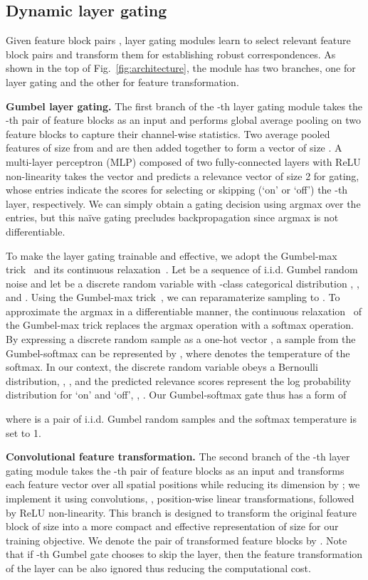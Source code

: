 \documentclass[runningheads]{llncs}
\begin{document}
\subsection{Dynamic layer gating}
Given  feature block pairs  ,  layer gating modules learn to select relevant feature block pairs and transform them for establishing robust correspondences.
As shown in the top of Fig.~\ref{fig:architecture}, the module has two branches, one for layer gating and the other for feature transformation. 

\smallbreak
\noindent \textbf{Gumbel layer gating.} 
The first branch of the -th layer gating module takes the -th pair of feature blocks  as an input and performs global average pooling on two feature blocks to capture their channel-wise statistics. Two average pooled features of size  from  and    are then added together to form a vector of size . A multi-layer perceptron (MLP) composed of two fully-connected layers with ReLU non-linearity takes the vector and predicts a relevance vector  of size 2 for gating, whose entries indicate the scores for selecting  or skipping (`on' or `off')  the -th layer, respectively. We can simply obtain a gating decision using argmax over the entries, but this  na\"ive gating precludes backpropagation since argmax is not differentiable. 

To make the layer gating trainable and effective, we adopt the Gumbel-max trick~\cite{gumbel1954statistical} and its continuous relaxation~\cite{eric2017categorical,maddison2017concrete}.
Let  be a sequence of i.i.d. Gumbel random noise and let  be a discrete random variable with -class categorical distribution , \ie,  and . 
Using the Gumbel-max trick~\cite{gumbel1954statistical}, we can reparamaterize sampling  to .  
To approximate the argmax in a differentiable manner, the continuous relaxation~\cite{eric2017categorical,maddison2017concrete} of the Gumbel-max trick replaces the argmax operation with a softmax operation. 
By expressing a discrete random sample  as a one-hot vector , a sample from the Gumbel-softmax can be represented by , where  denotes the temperature of the softmax. 
In our context, the discrete random variable obeys a Bernoulli distribution, \ie, , and the predicted relevance scores represent the log probability distribution for `on' and `off', \ie, . Our Gumbel-softmax gate thus has a form of 

where  is a pair of i.i.d. Gumbel random samples and the softmax temperature  is set to 1. 

\smallbreak
\noindent \textbf{Convolutional feature transformation.} The second branch of the -th layer gating module takes the -th pair of feature blocks  as an input and transforms each feature vector over all spatial positions while reducing its dimension by ; we implement it using  convolutions, \ie, position-wise linear transformations, followed by ReLU non-linearity. 
This branch is designed to transform the original feature block of size   into a more compact and effective representation of size  for our training objective. We denote the pair of transformed feature blocks by . 
Note that if -th Gumbel gate chooses to skip the layer, then the feature transformation of the layer can be also ignored thus reducing the computational cost.
\end{document}

